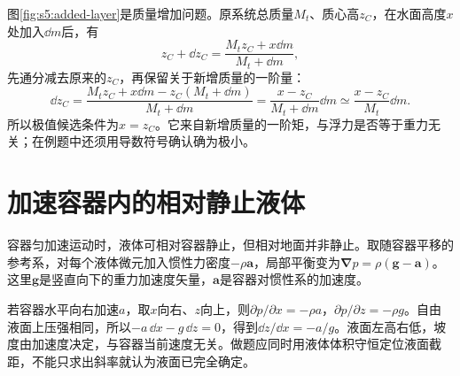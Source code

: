 图\ref{fig:s5:added-layer}是质量增加问题。原系统总质量$M_t$、质心高$z_C$，在水面高度$x$处加入$\dd m$后，有
\[
z_C+\dd z_C=\frac{M_tz_C+x\dd m}{M_t+\dd m},
\]
先通分减去原来的$z_C$，再保留关于新增质量的一阶量：
\[
\dd z_C=\frac{M_tz_C+x\dd m-z_C(M_t+\dd m)}{M_t+\dd m}
=\frac{x-z_C}{M_t+\dd m}\dd m
\simeq\frac{x-z_C}{M_t}\dd m.
\]
所以极值候选条件为$x=z_C$。它来自新增质量的一阶矩，与浮力是否等于重力无关；在例题中还须用导数符号确认确为极小。


\section{加速容器内的相对静止液体}
容器匀加速运动时，液体可相对容器静止，但相对地面并非静止。取随容器平移的参考系，对每个液体微元加入惯性力密度$-\rho\boldsymbol a$，局部平衡变为$\boldsymbol\nabla p=\rho(\boldsymbol g-\boldsymbol a)$。这里$\boldsymbol g$是竖直向下的重力加速度矢量，$\boldsymbol a$是容器对惯性系的加速度。

若容器水平向右加速$a$，取$x$向右、$z$向上，则$\partial p/\partial x=-\rho a$，$\partial p/\partial z=-\rho g$。自由液面上压强相同，所以$-a\,\dd x-g\,\dd z=0$，得到$\dd z/\dd x=-a/g$。液面左高右低，坡度由加速度决定，与容器当前速度无关。做题应同时用液体体积守恒定位液面截距，不能只求出斜率就认为液面已完全确定。

